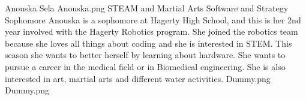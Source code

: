 \insertbio
{Anouska Sela}
{Anouska.png}
{STEAM and Martial Arts}
{Software and Strategy}
{Sophomore}
{
Anouska is a sophomore at Hagerty High School, and this is her 2nd year involved with the Hagerty Robotics program. She joined the robotics team because she loves all things about coding and she is interested in STEM. This season she wants to better herself by learning about hardware. She wants to pursue a career in the medical field or in Biomedical engineering. She is also interested in art, martial arts and different water activities. 
}
{Dummy.png}
{Dummy.png}
